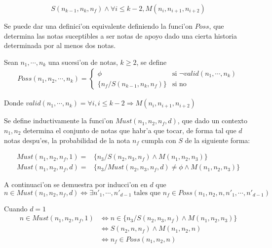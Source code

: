 $$  S(n_{k-1}, n_k, n_f) \land \forall i\leq k-2, M(n_i, n_{i+1}, n_{i+2})$$

Se puede dar una definici'on equivalente definiendo la funci'on $Poss$, que determina las notas suceptibles a ser notas de apoyo dado una cierta historia determinada por al menos dos notas.

\begin{definition}
\label{def:poss}
Sean $n_1, \cdots, n_k$ una sucesi'on de notas, $k\geq2$, se define
\begin{align*}
Poss(n_1, n_2, \cdots, n_k)= \left\{
 \begin{array}{rl}
  \phi & \text{si } \neg valid(n_1, \cdots, n_k) \\ %
   \{n_f / S(n_{k-1}, n_k, n_f)\} & \text{si no}
 \end{array} \right.
\end{align*}

Donde $valid(n_1, \cdots, n_k) = \forall i, i\leq k-2 \Rightarrow M(n_i, n_{i+1}, n_{i+2})$
\end{definition}

Se define inductivamente la funci'on $Must(n_1, n_2, n_f, d)$, que dado un contexto $n_1, n_2$ determina el conjunto de notas que habr'a que tocar, de forma tal
que $d$ notas despu'es, la probabilidad de la nota $n_f$ cumpla con $S$ de la siguiente forma:
\begin{definition}
\label{def:must}
\begin{align*}
Must(n_1, n_2, n_f, 1)=& \{n_3/ S(n_2, n_3, n_f) \land M(n_1, n_2, n_3)\}\\
Must(n_1, n_2, n_f, d)=& \{n_3/ Must(n_2, n_3, n_f, d) \neq \phi \land M(n_1,n_2, n_3)\}
\end{align*}
\end{definition}


A continuaci'on se demuestra por inducci'on en $d$ que 
$$n \in Must(n_1, n_2, n_f, d) \Leftrightarrow \exists n'_1, \cdots, n'_{d-1} \text{ tales que } n_f \in Poss(n_1, n_2, n, n'_1, \cdots, n'_{d-1})$$

Cuando $d=1$
\begin{align*}
n \in Must(n_1, n_2, n_f, 1)   & \Leftrightarrow n \in \{n_3/ S(n_2, n_3, n_f) \land M(n_1, n_2, n_3)\} \\
                               & \Leftrightarrow S(n_2, n, n_f) \land M(n_1, n_2, n)   \\
                               & \Leftrightarrow n_f \in Poss(n_1, n_2, n)
\end{align*}

